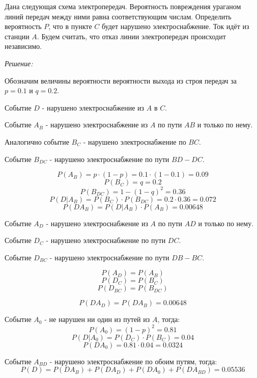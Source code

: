 Дана следующая схема электропередач. Вероятность повреждения ураганом линий передач между ними равна соответствующим числам. Определить вероятность $P$, что в пункте $C$ будет нарушено электроснабжение. Ток идёт из станции $A$. Будем считать, что отказ линии электропередач происходит независимо.
\begin{figure}[H]
\end{figure}

\textit{Решение:}

Обозначим величины вероятности вероятности выхода из строя передач за $p = 0.1$ и $q = 0.2$. 

Событие $D$ - нарушено электроснабжение из $A$ в $C$.

Событие $A_B$ - нарушено электроснабжение из $A$ по пути $AB$ и только по нему.

Аналогично событие $B_C$ - нарушено электроснабжение по $BC$.

Событие $B_{DC}$ - нарушено электроснабжение по пути $BD - DC$.

\[ P(A_B) = p \cdot (1 - p) = 0.1 \cdot (1 - 0.1) = 0.09 \]
\[ P(B_C) = q = 0.2 \]
\[ P(B_{DC}) = 1 - (1 - q)^2 = 0.36 \]
\[ P(D|A_B) = P(B_C) \cdot P(B_{DC}) = 0.2 \cdot 0.36 = 0.072 \]
\[ P(DA_B) = P(D|A_B) \cdot P(A_B) = 0.00648 \]

Событие $A_D$ - нарушено электроснабжение из $A$ по пути $AD$ и только по нему.

Событие $D_C$ - нарушено электроснабжение по пути $DC$.

Событие $D_{BC}$ - нарушено электроснабжение по пути $DB - BC$.

\[ P(A_D) = P(A_B) \]
\[ P(D_C) = P(B_C) \]
\[ P(D_{BC}) = P(B_{DC}) \]

\[ P(DA_D) = P(DA_B) = 0.00648 \]

Событие $A_0$ - не нарушен ни один из путей из $A$, тогда:
\[ P(A_0) = (1 - p)^2 = 0.81 \]
\[ P(D|A_0) = P(D_C) \cdot P(B_C) = 0.04 \]
\[ P(DA_0) = 0.81 \cdot 0.04 = 0.0324 \]

Событие $A_{BD}$ - нарушено электроснабжение по обоим путям, тогда:
\[ P(D) = P(DA_B) + P(DA_D) + P(DA_0) +P(DA_{BD}) = 0.05536 \]

 